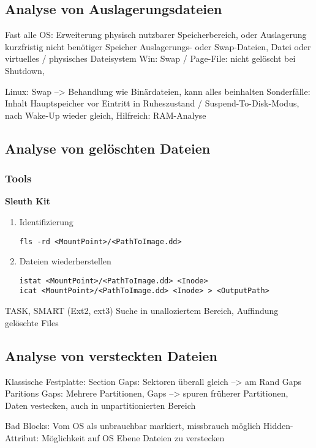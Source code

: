 \subsection{Analyse von Auslagerungsdateien}
Fast alle OS: Erweiterung physisch nutzbarer Speicherbereich, oder Auslagerung kurzfristig nicht benötiger Speicher
Auslagerungs- oder Swap-Dateien, Datei oder virtuelles / physisches Dateisystem
Win: Swap / Page-File: nicht gelöscht bei Shutdown, 

Linux: Swap --> Behandlung wie Binärdateien, kann alles beinhalten
Sonderfälle: Inhalt Hauptspeicher vor Eintritt in Ruheszustand / Suspend-To-Disk-Modus, nach Wake-Up wieder gleich, Hilfreich: RAM-Analyse


\subsection{Analyse von gelöschten Dateien}

\subsubsection{Tools}
\textbf{Sleuth Kit}\\
\begin{enumerate}
\item Identifizierung
\begin{lstlisting}
fls -rd <MountPoint>/<PathToImage.dd>
\end{lstlisting}
\item Dateien wiederherstellen
\begin{lstlisting}
istat <MountPoint>/<PathToImage.dd> <Inode>
icat <MountPoint>/<PathToImage.dd> <Inode> > <OutputPath>
\end{lstlisting}
\end{enumerate}


TASK, 
SMART (Ext2, ext3) Suche in unalloziertem Bereich, Auffindung gelöschte Files

\subsection{Analyse von versteckten Dateien}
Klassische Festplatte:
Section Gaps: Sektoren überall gleich --> am Rand Gaps
Paritions Gaps: Mehrere Partitionen, Gaps --> spuren früherer Partitionen, Daten vestecken, auch in unpartitionierten Bereich

Bad Blocks: Vom OS als unbrauchbar markiert, missbrauch möglich
Hidden-Attribut: Möglichkeit auf OS Ebene Dateien zu verstecken



